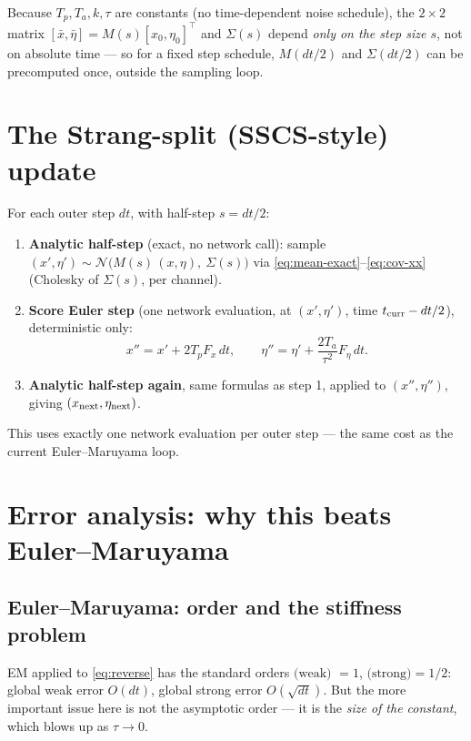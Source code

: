 \documentclass[11pt]{article}
\begin{document}
Because $T_p,T_a,k,\tau$ are constants (no time-dependent noise schedule), the
$2\times2$ matrix $[\bar x,\bar\eta] = M(s)[x_0,\eta_0]^\top$ and $\Sigma(s)$
depend \emph{only on the step size $s$}, not on absolute time — so for a fixed
step schedule, $M(dt/2)$ and $\Sigma(dt/2)$ can be precomputed once, outside
the sampling loop.

\section{The Strang-split (SSCS-style) update}

For each outer step $dt$, with half-step $s = dt/2$:
\begin{enumerate}
\item \textbf{Analytic half-step} (exact, no network call): sample
$(x',\eta') \sim \mathcal N\!\big(M(s)\,(x,\eta),\ \Sigma(s)\big)$ via
\eqref{eq:mean-exact}--\eqref{eq:cov-xx} (Cholesky of $\Sigma(s)$, per channel).
\item \textbf{Score Euler step} (one network evaluation, at $(x',\eta')$,
time $t_{\rm curr}-dt/2$), deterministic only:
\begin{equation}
x'' = x' + 2T_p F_x\,dt, \qquad
\eta'' = \eta' + \frac{2T_a}{\tau^2}F_\eta\,dt.
\end{equation}
\item \textbf{Analytic half-step again}, same formulas as step 1, applied to
$(x'',\eta'')$, giving $(x_{\rm next},\eta_{\rm next})$.
\end{enumerate}
This uses exactly one network evaluation per outer step — the same cost as
the current Euler--Maruyama loop.

\section{Error analysis: why this beats Euler--Maruyama}

\subsection{Euler--Maruyama: order and the stiffness problem}

EM applied to \eqref{eq:reverse} has the standard orders
$\text{(weak) }=1$, $\text{(strong)}=1/2$: global weak error $O(dt)$, global
strong error $O(\sqrt{dt})$. But the more important issue here is not the
asymptotic order — it is the \emph{size of the constant}, which blows up as
$\tau\to 0$.
\end{document}
